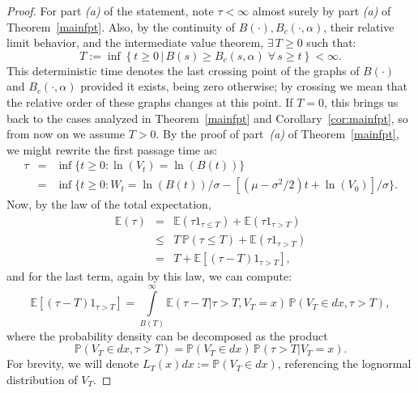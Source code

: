 \documentclass[12pt]{article}
\theoremstyle{definition}
\begin{document}
\begin{proof}
For part \textit{(a)} of the statement, note $\tau<\infty$ almost surely by part \textit{(a)} of Theorem~\ref{mainfpt}. Also, by the continuity of $B(\cdot),B_c(\cdot,\alpha)$, their relative limit behavior, and the intermediate value theorem, $\exists \, T \ge 0$ such that:
$$
T:=\inf \left\lbrace t\geq 0 \, \big\vert \, B(s) \geq B_c(s,\alpha) \; \forall \, s \ge t \right\rbrace<\infty.
$$
This deterministic time denotes the last crossing point of the graphs of $B(\cdot)$ and $B_c(\cdot,\alpha)$ provided it exists, being zero otherwise; by crossing we mean that the relative order of these graphs changes at this point. If $T=0$, this brings us back to the cases analyzed in Theorem~\ref{mainfpt} and Corollary~\ref{cor:mainfpt}, so from now on we assume $T>0$. By the proof of part~\textit{(a)} of Theorem~\ref{mainfpt}, we might rewrite the first passage time as:
\begin{eqnarray}\nonumber
\tau &=& \inf \{t \ge 0 : \ln(V_t) = \ln(B(t))\}\\ \nonumber
&=& \inf \{t \ge 0 : W_t = \ln(B(t))/\sigma - \left[(\mu - \sigma^2/2)t + \ln(V_0) \right]/\sigma \}.
\end{eqnarray}
Now, by the law of the total expectation,
\begin{eqnarray}
\label{eq:total_expectation}
\nonumber
\mathbb{E}(\tau)&=&\mathbb{E}(\tau 1_{\tau\leq T})+\mathbb{E}(\tau 1_{\tau> T})\\ \nonumber
&\leq& T \, \mathbb{P}(\tau\leq T)+\mathbb{E}(\tau 1_{\tau> T}) \\
&=& T+\mathbb{E}[(\tau-T) 1_{\tau> T}],
\end{eqnarray}
and for the last term, again by this law, we can compute:
$$
\mathbb{E}[(\tau-T) 1_{\tau> T}]=\int\limits_{B(T)}^\infty\mathbb{E}(\tau-T\vert\tau>T,V_T=x) \, \mathbb{P}(V_T\in dx, \tau>T),
$$
where the probability density can be decomposed as the product
$$\mathbb{P}(V_T\in dx, \tau>T)=\mathbb{P}(V_T\in dx) \, \mathbb{P}( \tau>T\vert V_T =x).
$$
For brevity, we will denote $L_T(x) dx:=\mathbb{P}(V_T\in dx)$, referencing the lognormal distribution of $V_T$.


\end{proof}
\end{document}
